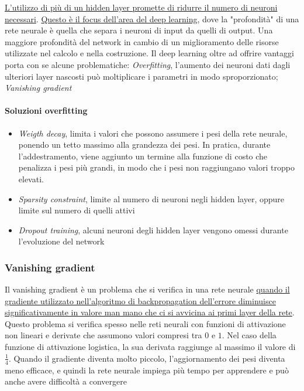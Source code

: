 \uline{L'utilizzo di più di un hidden layer promette di ridurre il numero di neuroni necessari}. \uline{Questo è il focus dell'area del deep learning}, dove la "profondità" di una rete neurale è quella che separa i neuroni di input da quelli di output. Una maggiore profondità del network in cambio di un miglioramento delle risorse utilizzate nel calcolo e nella costruzione. Il deep learning oltre ad offrire vantaggi porta con se alcune problematiche: \textit{Overfitting}, l'aumento dei neuroni dati dagli ulteriori layer nascosti può moltiplicare i parametri in modo sproporzionato; \textit{Vanishing gradient}

\paragraph{Soluzioni overfitting}
\begin{itemize}
    \item \textit{Weigth decay}, limita i valori che possono assumere i pesi della rete neurale, ponendo un tetto massimo alla grandezza dei pesi. In pratica, durante l'addestramento, viene aggiunto un termine alla funzione di costo che penalizza i pesi più grandi, in modo che i pesi non raggiungano valori troppo elevati.
    \item \textit{Sparsity constraint}, limite al numero di neuroni negli hidden layer, oppure limite sul numero di quelli attivi
    \item \textit{Dropout training}, alcuni neuroni degli hidden layer vengono omessi durante l’evoluzione del network
\end{itemize}

\subsubsection{Vanishing gradient}
Il vanishing gradient è un problema che si verifica in una rete neurale \uline{quando il gradiente utilizzato nell'algoritmo di backpropagation dell'errore diminuisce significativamente in valore man mano che ci si avvicina ai primi layer della rete}. Questo problema si verifica spesso nelle reti neurali con funzioni di attivazione non lineari e derivate che assumono valori compresi tra $0$ e $1$. Nel caso della funzione di attivazione logistica, la sua derivata raggiunge al massimo il valore di $\frac{1}{4}$. Quando il gradiente diventa molto piccolo, l'aggiornamento dei pesi diventa meno efficace, e quindi la rete neurale impiega più tempo per apprendere e può anche avere difficoltà a convergere

